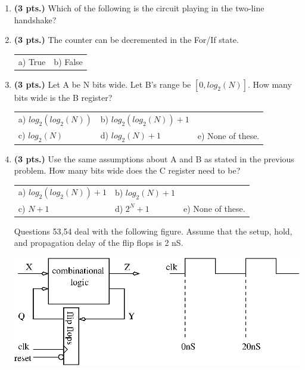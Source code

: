 \documentclass{article}
\begin{document}
\begin{enumerate}
\item{\bf (3 pts.)} Which of the following is the circuit playing in the
two-line handshake?

\item{\bf (3 pts.)} The counter can be decremented in the For/If state.

\begin{tabular}{p{1.75in}p{1.75in}}
a) True  & b) False \\
\end{tabular}

\item {\bf (3 pts.)} Let A be N bits wide.  Let B's range be $[0,log_2(N)]$.
How many bits wide is the B register?

\begin{tabular}{p{1.30in}p{1.30in}p{2.00in}}
a) $log_2(log_2(N))$ & b) $log_2(log_2(N))+1$ &   \\
c) $log_2(N)$ & d) $log_2(N)+1$ & e) None of these.\\
\end{tabular}

\item {\bf (3 pts.)} Use the same assumptions about A and B as stated in the previous
problem.  How many bits wide does the C register need to be?

\begin{tabular}{p{1.30in}p{1.3in}p{2.00in}}
a) $log_2(log_2(N))+1$ & b) $log_2(N)+1$ &   \\
c) $N+1$ & d) $2^N+1$ & e) None of these.\\
\end{tabular}
\vspace{5mm}

\pagebreak
Questions 53,54 deal with the following figure.  Assume that the
setup, hold, and propagation delay of the flip flops is 2 nS.

\includegraphics{./Fig3/fsm.eps}


\end{enumerate}
\end{document}
